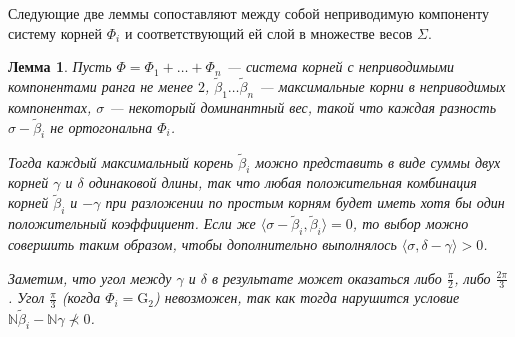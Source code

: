 \documentclass[12pt]{matmex-diploma}
\theoremstyle{mystyleni}
\theoremstyle{mystyle}
\newtheorem{lm}{Лемма}
\newcommand{\N}{\mathbb{N}}
\begin{document}
Следующие две леммы сопоставляют между собой неприводимую компоненту систему корней $\Phi_i$ и соответствующий ей слой в множестве весов $\Sigma$.

\begin{lm}\label{maxrootsum}
Пусть $\Phi=\Phi_1+\ldots+\Phi_n$ --- система корней с неприводимыми компонентами ранга не менее $2$, $\widetilde\beta_1 \ldots \widetilde\beta_n$ ---  максимальные корни в неприводимых компонентах, $\sigma$ --- некоторый доминантный вес, такой что каждая разность $\sigma-\widetilde\beta_i$ не ортогональна $\Phi_i$.

Тогда каждый максимальный корень $\widetilde\beta_i$ можно представить в виде суммы двух корней $\gamma$ и $\delta$ одинаковой длины, так что любая положительная комбинация корней $\widetilde\beta_i$ и $-\gamma$ при разложении по простым корням будет иметь хотя бы один положительный коэффициент.
Если же $\langle\sigma-\widetilde\beta_i,\widetilde\beta_i\rangle=0$, то выбор можно совершить таким образом, чтобы дополнительно выполнялось $\langle\sigma,\delta-\gamma\rangle>0$.

Заметим, что угол между $\gamma$ и $\delta$ в результате может оказаться либо $\frac{\pi}{2}$, либо $\frac{2\pi}{3}$. Угол $\frac{\pi}{3}$ (когда $\Phi_i = \mathrm{G}_2$) невозможен, так как тогда нарушится условие $\N\widetilde\beta_i-\N\gamma \nprec 0$.
\end{lm}
\end{document}
